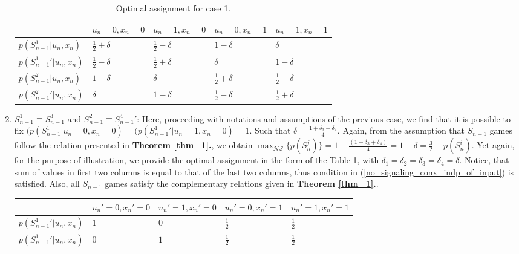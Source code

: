 \begin{widetext}
\begin{appendices}
\begin{enumerate}
\begin{table}[!htb]
\centering
\begin{tabular} {|l|l|l|l|l|} 
\hline
&$u_n=0,x_n=0$&$u_n=1,x_n=0$&$u_n=0,x_n=1$&$u_n=1,x_n=1$\tabularnewline \hline
$p({S_{n-1}^1}|u_n,x_n)$& $\frac{1}{2}+\delta$ & $\frac{1}{2}-\delta$ & $1-\delta$&$\delta$\tabularnewline \hline
$p({S_{n-1}^1}{'}|u_n,x_n)$& $\frac{1}{2}-\delta$ & $\frac{1}{2}+\delta$ & $\delta$ &$1-\delta$\tabularnewline \hline
$p({S_{n-1}^2}|u_n,x_n)$&$1-\delta$ & $\delta$ & $\frac{1}{2}+\delta$&$\frac{1}{2}-\delta$\tabularnewline \hline
$p({S_{n-1}^2}{'}|u_n,x_n)$& $\delta$ & $1-\delta$ & $\frac{1}{2}-\delta$ &$\frac{1}{2}+\delta$\tabularnewline \hline
\end{tabular}
\caption{\label{Sncase1} Optimal assignment for case 1. }
\end{table}
\item $S_{n-1}^1 \equiv S_{n-1}^3$   and $S_{n-1}^2  \equiv {S_{n-1}^4}{'}$: Here, proceeding with notations and assumptions of the previous case, we find that it is possible to fix $(p({S_{n-1}^1}|u_n=0,x_n=0)=(p({{S_{n-1}^1}{'}}|u_n=1,x_n=0)=1$. Such that $\delta=\frac{1+\delta_3+\delta_4}{4}$. Again, from the assumption that $S_{n-1}$ games follow the relation presented in \textbf{Theorem \ref{thm_1}.}, we obtain $\max_{\mathcal{NS}}\{p(S_n^j)\}=1-\frac{(1+\delta_3+\delta_4)}{4}=1-\delta=\frac{3}{2}-p(S_n^i)$. Yet again, for the purpose of illustration, we provide the optimal assignment in the form of the Table \ref{Sncase1}, with $\delta_1=\delta_2=\delta_3=\delta_4=\delta$. Notice, that sum of values in first two columns is equal to that of the last two columns, thus condition in (\ref{no_signaling_conx_indp_of_input}) is satisfied. Also, all $S_{n-1}$ games satisfy the complementary relations given in \textbf{Theorem \ref{thm_1}.}.
\begin{table}[!htb]
\centering
\begin{tabular} {|l|l|l|l|l|} 
\hline
&$u_n{'}=0,x_n{'}=0$&$u_n{'}=1,x_n{'}=0$&$u_n{'}=0,x_n{'}=1$&$u_n{'}=1,x_n{'}=1$\\ \hline

$p({S_{n-1}^1}'|u_n,x_n)$& $1$ & $0$ & $\frac{1}{2}$&$\frac{1}{2}$\\ \hline

$p({S_{n-1}^1}'|u_n,x_n)$& $0$ & $1$ & $\frac{1}{2}$ &$\frac{1}{2}$\\ \hline


\end{tabular}
\end{table}
\end{enumerate}
\end{appendices}
\end{widetext}
